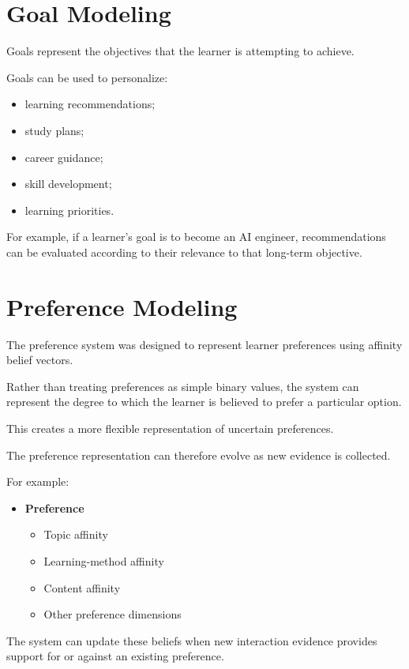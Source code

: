 \documentclass[12pt,a4paper]{article}
\begin{document}
\section{Goal Modeling}
Goals represent the objectives that the learner is attempting to achieve.

Goals can be used to personalize:
\begin{itemize}[noitemsep,topsep=2pt]
    \item learning recommendations;
    \item study plans;
    \item career guidance;
    \item skill development;
    \item learning priorities.
\end{itemize}

For example, if a learner's goal is to become an AI engineer, recommendations can be evaluated according to their relevance to that long-term objective.

\section{Preference Modeling}
The preference system was designed to represent learner preferences using affinity belief vectors.

Rather than treating preferences as simple binary values, the system can represent the degree to which the learner is believed to prefer a particular option.

This creates a more flexible representation of uncertain preferences.

The preference representation can therefore evolve as new evidence is collected.

For example:
\begin{itemize}[noitemsep,topsep=2pt]
    \item[] \textbf{Preference}
    \begin{itemize}[noitemsep,topsep=1pt]
        \item[$\vdash$] Topic affinity
        \item[$\vdash$] Learning-method affinity
        \item[$\vdash$] Content affinity
        \item[$\llcorner$] Other preference dimensions
    \end{itemize}
\end{itemize}

The system can update these beliefs when new interaction evidence provides support for or against an existing preference.
\end{document}
